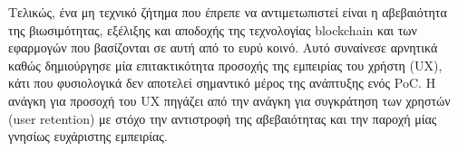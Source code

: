 Τελικώς, ένα μη τεχνικό ζήτημα που έπρεπε να αντιμετωπιστεί είναι η αβεβαιότητα της βιωσιμότητας, εξέλιξης και αποδοχής της τεχνολογίας blockchain και των εφαρμογών που βασίζονται σε αυτή από το ευρύ κοινό. Αυτό συναίνεσε αρνητικά καθώς δημιούργησε μία επιτακτικότητα προσοχής της εμπειρίας του χρήστη (UX), κάτι που φυσιολογικά δεν αποτελεί σημαντικό μέρος της ανάπτυξης ενός PoC. Η ανάγκη για προσοχή του UX πηγάζει από την ανάγκη για συγκράτηση των χρηστών (user retention) με στόχο την αντιστροφή της αβεβαιότητας και την παροχή μίας γνησίως ευχάριστης εμπειρίας.
